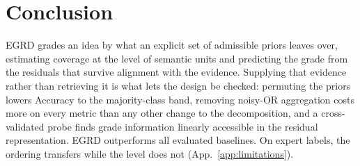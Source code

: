 \section{Conclusion}
\label{sec:conclusion}

EGRD grades an idea by what an explicit set of admissible priors leaves over,
estimating coverage at the level of semantic units and predicting the grade from
the residuals that survive alignment with the evidence. Supplying that evidence
rather than retrieving it is what lets the design be checked: permuting the
priors lowers Accuracy to the majority-class band, removing noisy-OR
aggregation costs more on every metric than any other change to the
decomposition, and a cross-validated probe finds grade information linearly
accessible in the residual representation. EGRD outperforms all evaluated
baselines. On expert labels, the ordering transfers while the level does not
(App.~\ref{app:limitations}).
